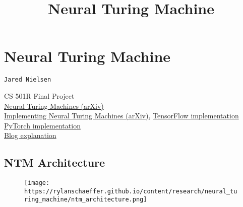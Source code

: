 \documentclass[11pt]{article}
\title{Neural Turing Machine}
\makeatletter
\def\maxwidth{\ifdim\Gin@nat@width>\linewidth\linewidth
    \else\Gin@nat@width\fi}
\let\Oldincludegraphics\includegraphics
\renewcommand{\includegraphics}[1]{\Oldincludegraphics[width=.8\maxwidth]{#1}}
\makeatother
\begin{document}
    
    
    \maketitle
    
    

    
    \section{Neural Turing Machine}\label{neural-turing-machine}

\begin{verbatim}
Jared Nielsen
\end{verbatim}

CS 501R Final Project\\
\href{https://arxiv.org/pdf/1410.5401.pdf}{Neural Turing Machines
(arXiv)}\\
\href{https://arxiv.org/pdf/1807.08518.pdf}{Implementing Neural Turing
Machines (arXiv)},
\href{https://github.com/MarkPKCollier/NeuralTuringMachine}{TensorFlow
implementation}\\
\href{https://github.com/loudinthecloud/pytorch-ntm}{PyTorch
implementation}\\
\href{https://rylanschaeffer.github.io/content/research/neural_turing_machine/main.html}{Blog
explanation}

    \subsection{NTM Architecture}\label{ntm-architecture}

\begin{figure}
\centering
\texttt{[image: https://rylanschaeffer.github.io/content/research/neural\_turing\_machine/ntm\_architecture.png]}
\caption{}
\end{figure}
\end{document}
